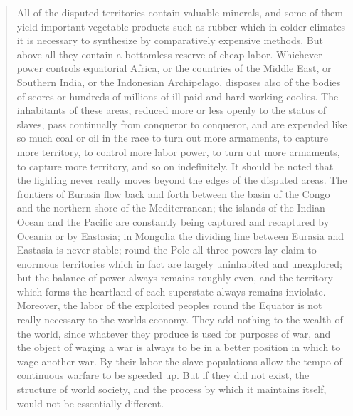 \begin{paracol}{2}
\switchcolumn*

\begin{quotation}
All of the disputed territories contain valuable minerals, and some of
them yield important vegetable products such as rubber which in colder
climates it is necessary to synthesize by comparatively expensive
methods. But above all they contain a bottomless reserve of cheap labor.
Whichever power controls equatorial Africa, or the countries of the
Middle East, or Southern India, or the Indonesian Archipelago, disposes
also of the bodies of scores or hundreds of millions of ill-paid and
hard-working coolies. The inhabitants of these areas, reduced more or
less openly to the status of slaves, pass continually from conqueror to
conqueror, and are expended like so much coal or oil in the race to turn
out more armaments, to capture more territory, to control more labor
power, to turn out more armaments, to capture more territory, and so on
indefinitely. It should be noted that the fighting never really moves
beyond the edges of the disputed areas. The frontiers of Eurasia flow
back and forth between the basin of the Congo and the northern shore of
the Mediterranean; the islands of the Indian Ocean and the Pacific are
constantly being captured and recaptured by Oceania or by Eastasia; in
Mongolia the dividing line between Eurasia and Eastasia is never stable;
round the Pole all three powers lay claim to enormous territories which
in fact are largely uninhabited and unexplored; but the balance of power
always remains roughly even, and the territory which forms the heartland
of each superstate always remains inviolate. Moreover, the labor of the
exploited peoples round the Equator is not really necessary to the
world\textquotesingle s economy. They add nothing to the wealth of the
world, since whatever they produce is used for purposes of war, and the
object of waging a war is always to be in a better position in which to
wage another war. By their labor the slave populations allow the tempo
of continuous warfare to be speeded up. But if they did not exist, the
structure of world society, and the process by which it maintains
itself, would not be essentially different.
\end{quotation}

\switchcolumn


\end{paracol}
